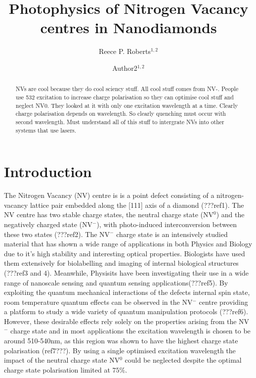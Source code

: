 \documentclass[,prl,twocolumn]{revtex4}
\begin{document}
\title{Photophysics of Nitrogen Vacancy centres in Nanodiamonds}
  
\author{Reece P. Roberts$^{1,2}$}
\author{Author2$^{1,2}$}



\begin{abstract}
NVs are cool because they do cool sciency stuff.
All cool stuff comes from NV-.
People use 532 excitation to increase charge polarisation so they can optimise cool stuff and neglect NV0.
They looked at it with only one excitation wavelength at a time. 
Clearly charge polarisation depends on wavelength.
So clearly quenching must occur with second wavelength.
Must understand all of this stuff to intergrate NVs into other systems that use lasers.
\end{abstract}

\maketitle

\section{Introduction}
The Nitrogen Vacancy (NV) centre is is a point defect consisting of a nitrogen-vacancy lattice pair embedded along the [111] axis of a diamond (???ref1). The NV centre has two stable charge states, the neutral charge state (NV$^0$) and the negatively charged state (NV$^-$), with photo-induced interconversion between these two states (???ref2). The NV$^-$ charge state is an intensively studied material that has shown a wide range of applications in both Physics and Biology due to it's high stability and interesting optical properties. Biologists have used them extensively for biolabelling and imaging of internal biological structures (???ref3 and 4). Meanwhile, Physisits have been investigating their use in a wide range of nanoscale sensing and quantum sensing applications(???ref5). By exploiting the quantum mechanical interactions of the defects internal spin state, room temperature quantum effects can be observed in the NV$^-$ centre providing a platform to study a wide variety of quantum manipulation protocols (???ref6). However, these desirable effects rely solely on the properties arising from the NV$^-$ charge state and in most applications the excitation wavelength is chosen to be around 510-540nm, as this region was shown to have the highest charge state polarisation (ref7???). By using a single optimised excitation wavelength the impact of the neutral charge state NV$^0$ could be neglected despite the optimal charge state polarisation limited at $75\%$. 
\end{document}
